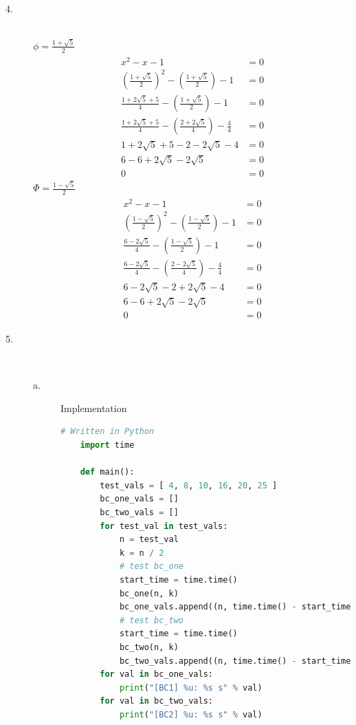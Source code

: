 \documentclass[paper=a4, fontsize=11pt]{scrartcl} %
\numberwithin{equation}{section} %
\numberwithin{figure}{section} %
\numberwithin{table}{section} %
\begin{document}
\begin{description}
    \item[4.] \hfill \\
        $\phi = \frac{ 1 + \sqrt{5} }{ 2 }$ \\
        \begin{align}
        \begin{split}
            x^2 - x - 1 & = 0 \\
            (\frac{ 1 + \sqrt{5} }{ 2 })^2 - (\frac{ 1 + \sqrt{5} }{ 2 }) - 1 & = 0 \\
            \frac{ 1 + 2\sqrt{5} + 5 }{ 4 } - (\frac{ 1 + \sqrt{5} }{ 2 }) - 1 & = 0 \\
            \frac{ 1 + 2\sqrt{5} + 5 }{ 4 } - (\frac{ 2 + 2\sqrt{5} }{ 4 }) - \frac{ 4 }{ 4 } & = 0 \\
            1 + 2\sqrt{5} + 5 - 2 - 2\sqrt{5} - 4 & = 0 \\
            6 - 6 + 2\sqrt{5} - 2\sqrt{5} & = 0 \\
            0 &= 0
        \end{split}
        \end{align}
        $\Phi = \frac{ 1 - \sqrt{5} }{ 2 }$ \\
        \begin{align}
        \begin{split}
            x^2 - x - 1 & = 0 \\
            (\frac{ 1 - \sqrt{5} }{ 2 })^2 - (\frac{ 1 - \sqrt{5} }{ 2 }) - 1 & = 0 \\
            \frac{ 6 - 2\sqrt{5} }{ 4 } - (\frac{ 1 - \sqrt{5} }{ 2 }) - 1 & = 0 \\
            \frac{ 6 - 2\sqrt{5} }{ 4 } - (\frac{ 2 - 2\sqrt{5} }{ 4 }) - \frac{ 4 }{ 4 } & = 0 \\
            6 - 2\sqrt{5} - 2 + 2\sqrt{5} - 4 & = 0 \\
            6 - 6 + 2\sqrt{5} - 2\sqrt{5} & = 0 \\
            0 &= 0
        \end{split}
        \end{align}
    \item[5.] \hfill \\
        \begin{description}
        \item[a.] Implementation \\
    \begin{lstlisting}[language=Python]
    # Written in Python
    import time

    def main():
        test_vals = [ 4, 8, 10, 16, 20, 25 ]
        bc_one_vals = []
        bc_two_vals = []
        for test_val in test_vals:
            n = test_val
            k = n / 2
            # test bc_one
            start_time = time.time()
            bc_one(n, k)
            bc_one_vals.append((n, time.time() - start_time))
            # test bc_two
            start_time = time.time()
            bc_two(n, k)
            bc_two_vals.append((n, time.time() - start_time))
        for val in bc_one_vals:
            print("[BC1] %u: %s s" % val)
        for val in bc_two_vals:
            print("[BC2] %u: %s s" % val)
    

\end{lstlisting}
\end{description}
\end{description}
\end{document}
